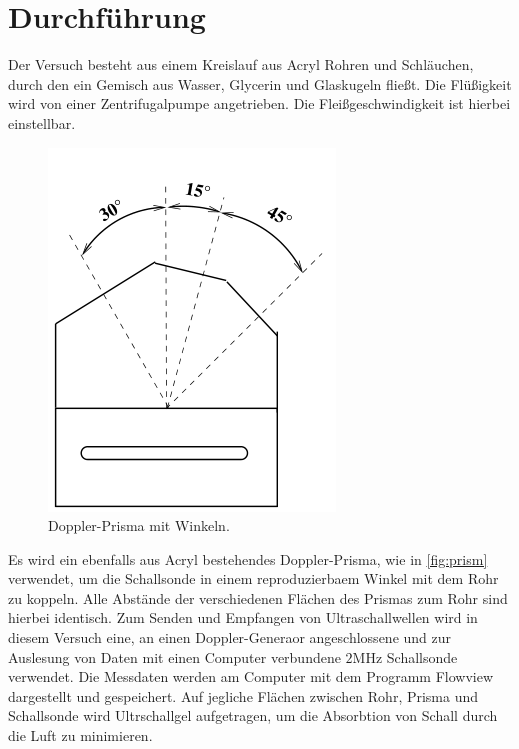 \section{Durchführung}
\label{sec:Durchführung}

Der Versuch besteht aus einem Kreislauf aus Acryl Rohren und Schläuchen, durch den ein Gemisch aus Wasser, Glycerin und Glaskugeln fließt. Die Flüßigkeit wird von
einer Zentrifugalpumpe angetrieben. Die Fleißgeschwindigkeit ist hierbei einstellbar.

\begin{figure}[H]
	\centering
	\includegraphics[width=0.6\linewidth]{data/prisma.png}
	\caption{Doppler-Prisma mit Winkeln.}
	\label{fig:prism}
\end{figure}
\noindent
Es wird ein ebenfalls aus Acryl bestehendes Doppler-Prisma, wie in \autoref{fig:prism} verwendet, um die Schallsonde in einem reproduzierbaem Winkel mit dem Rohr zu koppeln.
Alle Abstände der verschiedenen Flächen des Prismas zum Rohr sind hierbei identisch.
\newline
Zum Senden und Empfangen von Ultraschallwellen wird in diesem Versuch eine, an einen Doppler-Generaor angeschlossene und zur Auslesung von Daten mit einen Computer verbundene
$2\si{\mega\Hz}$ Schallsonde verwendet. Die Messdaten werden am Computer mit dem Programm Flowview dargestellt und gespeichert.
\newline
Auf jegliche Flächen zwischen Rohr, Prisma und Schallsonde wird Ultrschallgel aufgetragen, um die Absorbtion von Schall durch die Luft zu minimieren.
\newline\newline
